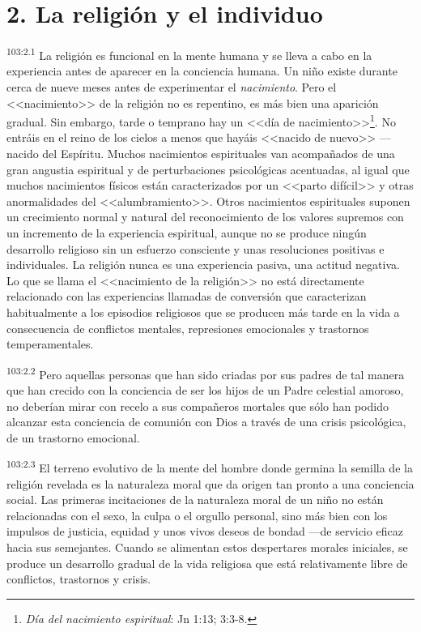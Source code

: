 \documentclass[twoside, 11pt]{book}
\begin{document}
\section*{2. La religión y el individuo}
\par
\textsuperscript{103:2.1} La religión es funcional en la mente humana y se lleva a cabo en la experiencia antes de aparecer en la conciencia humana. Un niño existe durante cerca de nueve meses antes de experimentar el \textit{nacimiento}. Pero el <<nacimiento>> de la religión no es repentino, es más bien una aparición gradual. Sin embargo, tarde o temprano hay un <<día de nacimiento>>\footnote{\textit{Día del nacimiento espiritual}: Jn 1:13; 3:3-8.}. No entráis en el reino de los cielos a menos que hayáis <<nacido de nuevo>> ---nacido del Espíritu. Muchos nacimientos espirituales van acompañados de una gran angustia espiritual y de perturbaciones psicológicas acentuadas, al igual que muchos nacimientos físicos están caracterizados por un <<parto difícil>> y otras anormalidades del <<alumbramiento>>. Otros nacimientos espirituales suponen un crecimiento normal y natural del reconocimiento de los valores supremos con un incremento de la experiencia espiritual, aunque no se produce ningún desarrollo religioso sin un esfuerzo consciente y unas resoluciones positivas e individuales. La religión nunca es una experiencia pasiva, una actitud negativa. Lo que se llama el <<nacimiento de la religión>> no está directamente relacionado con las experiencias llamadas de conversión que caracterizan habitualmente a los episodios religiosos que se producen más tarde en la vida a consecuencia de conflictos mentales, represiones emocionales y trastornos temperamentales.

\par
\textsuperscript{103:2.2} Pero aquellas personas que han sido criadas por sus padres de tal manera que han crecido con la conciencia de ser los hijos de un Padre celestial amoroso, no deberían mirar con recelo a sus compañeros mortales que sólo han podido alcanzar esta conciencia de comunión con Dios a través de una crisis psicológica, de un trastorno emocional.

\par
\textsuperscript{103:2.3} El terreno evolutivo de la mente del hombre donde germina la semilla de la religión revelada es la naturaleza moral que da origen tan pronto a una conciencia social. Las primeras incitaciones de la naturaleza moral de un niño no están relacionadas con el sexo, la culpa o el orgullo personal, sino más bien con los impulsos de justicia, equidad y unos vivos deseos de bondad ---de servicio eficaz hacia sus semejantes. Cuando se alimentan estos despertares morales iniciales, se produce un desarrollo gradual de la vida religiosa que está relativamente libre de conflictos, trastornos y crisis.
\end{document}
